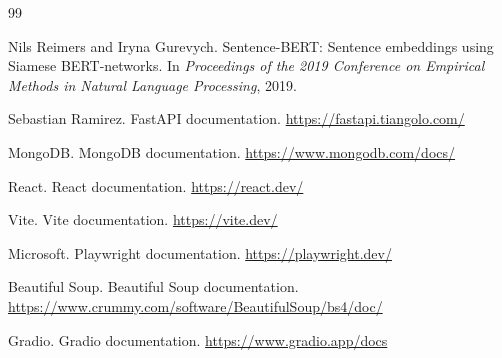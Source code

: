 \documentclass[12pt,a4paper,oneside]{report}
\begin{document}
\begin{thebibliography}{99}

Nils Reimers and Iryna Gurevych.
\newblock Sentence-BERT: Sentence embeddings using Siamese BERT-networks.
\newblock In \emph{Proceedings of the 2019 Conference on Empirical Methods in Natural Language Processing}, 2019.

Sebastian Ramirez.
\newblock FastAPI documentation.
\newblock \url{https://fastapi.tiangolo.com/}

MongoDB.
\newblock MongoDB documentation.
\newblock \url{https://www.mongodb.com/docs/}

React.
\newblock React documentation.
\newblock \url{https://react.dev/}

Vite.
\newblock Vite documentation.
\newblock \url{https://vite.dev/}

Microsoft.
\newblock Playwright documentation.
\newblock \url{https://playwright.dev/}

Beautiful Soup.
\newblock Beautiful Soup documentation.
\newblock \url{https://www.crummy.com/software/BeautifulSoup/bs4/doc/}

Gradio.
\newblock Gradio documentation.
\newblock \url{https://www.gradio.app/docs}

\end{thebibliography}
\end{document}
